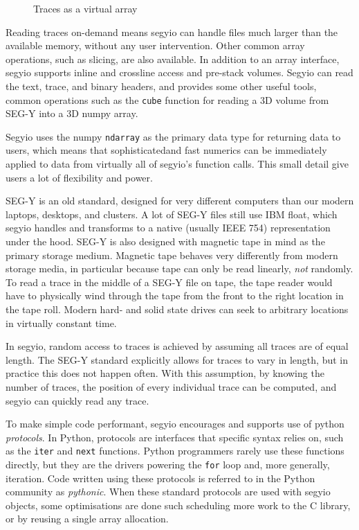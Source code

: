 \documentclass{article}
\begin{document}
\begin{figure}[h]
    \resizebox{\textwidth}{!}{
        
    }
    \caption{Traces as a virtual array}
\end{figure}

Reading traces on-demand means segyio can handle files much larger than the
available memory, without any user intervention. Other common array operations,
such as slicing, are also available. In addition to an array interface, segyio
supports inline and crossline access and pre-stack volumes. Segyio can read the
text, trace, and binary headers, and provides some other useful tools, common
operations such as the \verb|cube| function for reading a 3D volume from SEG-Y
into a 3D numpy array.

Segyio uses the numpy \verb|ndarray| as the primary data type for returning
data to users, which means that sophisticatedand fast numerics can be
immediately applied to data from virtually all of segyio's function calls. This
small detail give users a lot of flexibility and power.

SEG-Y is an old standard, designed for very different computers than our modern
laptops, desktops, and clusters. A lot of SEG-Y files still use IBM float,
which segyio handles and transforms to a native (usually IEEE 754)
representation under the hood. SEG-Y is also designed with magnetic tape in
mind as the primary storage medium. Magnetic tape behaves very differently from
modern storage media, in particular because tape can only be read linearly,
\emph{not} randomly. To read a trace in the middle of a SEG-Y file on tape, the
tape reader would have to physically wind through the tape from the front to
the right location in the tape roll. Modern hard- and solid state drives can
seek to arbitrary locations in virtually constant time.

In segyio, random access to traces is achieved by assuming all traces are of
equal length. The SEG-Y standard explicitly allows for traces to vary in
length, but in practice this does not happen often. With this assumption,
by knowing the number of traces, the position of every individual trace can be
computed, and segyio can quickly read any trace.

To make simple code performant, segyio encourages and supports use of python
\emph{protocols}. In Python, protocols are interfaces that specific syntax
relies on, such as the \verb|iter| and \verb|next| functions. Python
programmers rarely use these functions directly, but they are the drivers
powering the \verb|for| loop and, more generally, iteration. Code written using
these protocols is referred to in the Python community as \emph{pythonic}. When
these standard protocols are used with segyio objects, some optimisations are
done such scheduling more work to the C library, or by reusing a single array
allocation.
\end{document}
